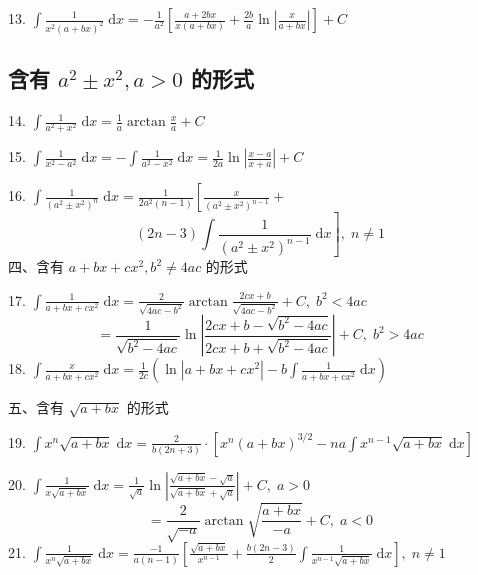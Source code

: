 13. \(\int \frac{1}{{x}^{2}{\left( a + bx\right) }^{2}}\mathrm{\;d}x =  - \frac{1}{{a}^{2}}\left\lbrack  {\frac{a + {2bx}}{x\left( {a + {bx}}\right) } + \frac{2b}{a}\ln \left| \frac{x}{a + {bx}}\right| }\right\rbrack   + C\)

\subsection{含有 \({a}^{2} \pm  {x}^{2},a > 0\) 的形式}

14. \(\int \frac{1}{{a}^{2} + {x}^{2}}\mathrm{\;d}x = \frac{1}{a}\arctan \frac{x}{a} + C\)

15. \(\int \frac{1}{{x}^{2} - {a}^{2}}\mathrm{\;d}x =  - \int \frac{1}{{a}^{2} - {x}^{2}}\mathrm{\;d}x = \frac{1}{2a}\ln \left| \frac{x - a}{x + a}\right|  + C\)

16. \(\int \frac{1}{{\left( {a}^{2} \pm  {x}^{2}\right) }^{n}}\mathrm{\;d}x = \frac{1}{2{a}^{2}\left( {n - 1}\right) }\left\lbrack  {\frac{x}{{\left( {a}^{2} \pm  {x}^{2}\right) }^{n - 1}} + }\right.\)
\[
\left. {\left( {{2n} - 3}\right) \int \frac{1}{{\left( {a}^{2} \pm  {x}^{2}\right) }^{n - 1}}\mathrm{\;d}x}\right\rbrack  ,\;n \neq  1
\]
四、含有 \(a + {bx} + c{x}^{2},{b}^{2} \neq  {4ac}\) 的形式

17. \(\int \frac{1}{a + {bx} + c{x}^{2}}\mathrm{\;d}x = \frac{2}{\sqrt{{4ac} - {b}^{2}}}\arctan \frac{{2cx} + b}{\sqrt{{4ac} - {b}^{2}}} + C,\;{b}^{2} < {4ac}\)
\[
= \frac{1}{\sqrt{{b}^{2} - {4ac}}}\ln \left| \frac{{2cx} + b - \sqrt{{b}^{2} - {4ac}}}{{2cx} + b + \sqrt{{b}^{2} - {4ac}}}\right|  + C,\;{b}^{2} > {4ac}
\]
18. \(\int \frac{x}{a + {bx} + c{x}^{2}}\mathrm{\;d}x = \frac{1}{2c}\left( {\ln \left| {a + {bx} + c{x}^{2}}\right|  - b\int \frac{1}{a + {bx} + c{x}^{2}}\mathrm{\;d}x}\right)\)

五、含有 \(\sqrt{a + {bx}}\) 的形式

19. \(\int {x}^{n}\sqrt{a + {bx}}\mathrm{\;d}x = \frac{2}{b\left( {{2n} + 3}\right) } \cdot  \left\lbrack  {{x}^{n}{\left( a + bx\right) }^{3/2} - {na}\int {x}^{n - 1}\sqrt{a + {bx}}\mathrm{\;d}x}\right\rbrack\)

20. \(\int \frac{1}{x\sqrt{a + {bx}}}\mathrm{\;d}x = \frac{1}{\sqrt{a}}\ln \left| \frac{\sqrt{a + {bx}} - \sqrt{a}}{\sqrt{a + {bx}} + \sqrt{a}}\right|  + C,\;a > 0\)
\[
= \frac{2}{\sqrt{-a}}\arctan \sqrt{\frac{a + {bx}}{-a}} + C,\;a < 0
\]
21. \(\int \frac{1}{{x}^{n}\sqrt{a + {bx}}}\mathrm{\;d}x = \frac{-1}{a\left( {n - 1}\right) }\left\lbrack  {\frac{\sqrt{a + {bx}}}{{x}^{n - 1}} + \frac{b\left( {{2n} - 3}\right) }{2}\int \frac{1}{{x}^{n - 1}\sqrt{a + {bx}}}\mathrm{\;d}x}\right\rbrack  ,\;n \neq  1\)

